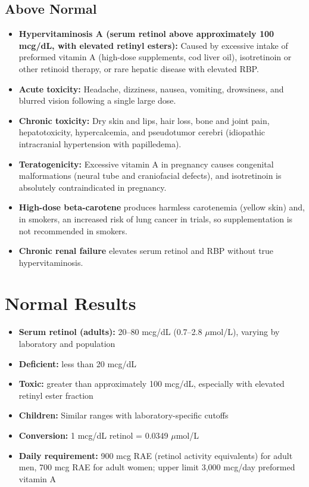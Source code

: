 \subsection*{Above Normal}
\begin{itemize}
  \item \textbf{Hypervitaminosis A (serum retinol above approximately 100 mcg/dL, with elevated retinyl esters):} Caused by excessive intake of preformed vitamin A (high-dose supplements, cod liver oil), isotretinoin or other retinoid therapy, or rare hepatic disease with elevated RBP.
  \item \textbf{Acute toxicity:} Headache, dizziness, nausea, vomiting, drowsiness, and blurred vision following a single large dose.
  \item \textbf{Chronic toxicity:} Dry skin and lips, hair loss, bone and joint pain, hepatotoxicity, hypercalcemia, and pseudotumor cerebri (idiopathic intracranial hypertension with papilledema).
  \item \textbf{Teratogenicity:} Excessive vitamin A in pregnancy causes congenital malformations (neural tube and craniofacial defects), and isotretinoin is absolutely contraindicated in pregnancy.
  \item \textbf{High-dose beta-carotene} produces harmless carotenemia (yellow skin) and, in smokers, an increased risk of lung cancer in trials, so supplementation is not recommended in smokers.
  \item \textbf{Chronic renal failure} elevates serum retinol and RBP without true hypervitaminosis.
\end{itemize}

\section*{Normal Results}
\begin{itemize}
  \item \textbf{Serum retinol (adults):} 20--80 mcg/dL (0.7--2.8 $\mu$mol/L), varying by laboratory and population
  \item \textbf{Deficient:} less than 20 mcg/dL
  \item \textbf{Toxic:} greater than approximately 100 mcg/dL, especially with elevated retinyl ester fraction
  \item \textbf{Children:} Similar ranges with laboratory-specific cutoffs
  \item \textbf{Conversion:} 1 mcg/dL retinol = 0.0349 $\mu$mol/L
  \item \textbf{Daily requirement:} 900 mcg RAE (retinol activity equivalents) for adult men, 700 mcg RAE for adult women; upper limit 3,000 mcg/day preformed vitamin A
\end{itemize}

